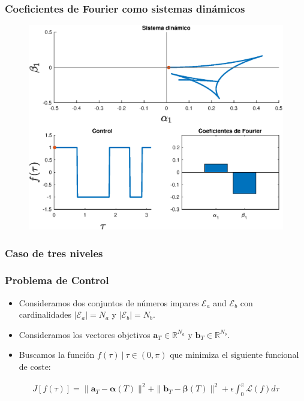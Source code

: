 \begin{frame}
    \frametitle{Coeficientes de Fourier como sistemas dinámicos}
    \begin{figure}
        \includegraphics[scale=0.5]{imgs/S0001.eps}
    \end{figure}
\end{frame}

\begin{frame}
    \frametitle{Caso de tres niveles}

    

\end{frame}


\begin{frame}
    \frametitle{Problema de Control}
    \begin{problem}\label{OCP1}
        \begin{itemize}
            \item Consideramos dos conjuntos de números impares $\mathcal{E}_a$ and $\mathcal{E}_b$ con cardinalidades $|\mathcal{E}_a| = N_a$ y  $|\mathcal{E}_b| = N_b$.
            \item Consideramos los vectores objetivos $\bm{a}_T  \in \mathbb{R}^{N_a}$ y $\bm{b}_T  \in \mathbb{R}^{N_b}$.
            \item Buscamos la función  $f(\tau ) \ | \ \tau \in (0,\pi)$ que minimiza el siguiente funcional de coste:

        \end{itemize}
            \begin{gather}
            J[f(\tau)] =  \| \bm{a}_T - \bm{\alpha}(T)\|^2 + \| \bm{b}_T - \bm{\beta}(T)\|^2 
            + \epsilon \int_0^{\pi} \mathcal{L}(f) d\tau  
        \end{gather}
    \end{problem}
\end{frame}

